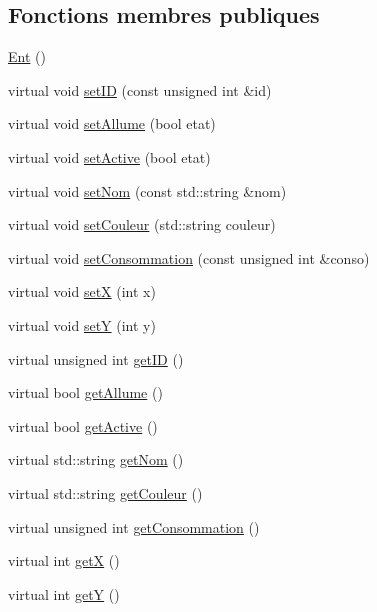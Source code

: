 \subsection*{Fonctions membres publiques}
\begin{DoxyCompactItemize}
\item 
\hyperlink{classEclairage_1_1Ent_a2c185a5889bd49a541d9e1785b25322a}{Ent} ()
\item 
virtual void \hyperlink{classEclairage_1_1Ent_a927ff132e908bb3e68dab254f6c2ac2d}{set\+ID} (const unsigned int \&id)
\item 
virtual void \hyperlink{classEclairage_1_1Ent_a3c9d21bd3c725857050e39eb449d1ad5}{set\+Allume} (bool etat)
\item 
virtual void \hyperlink{classEclairage_1_1Ent_a1e9471a412f746a2284778c8d9548499}{set\+Active} (bool etat)
\item 
virtual void \hyperlink{classEclairage_1_1Ent_a348836d7b3c2f69f376d63c84ace8e3e}{set\+Nom} (const std\+::string \&nom)
\item 
virtual void \hyperlink{classEclairage_1_1Ent_a4cf307c89bd19221aa2cd338fa2eef7d}{set\+Couleur} (std\+::string couleur)
\item 
virtual void \hyperlink{classEclairage_1_1Ent_a64c03bcbe84186341b0d9f23e91cdfd8}{set\+Consommation} (const unsigned int \&conso)
\item 
virtual void \hyperlink{classEclairage_1_1Ent_a4c5528c086dee2b6c5433c6e103f7eeb}{setX} (int x)
\item 
virtual void \hyperlink{classEclairage_1_1Ent_abdf5e31d5b5788c832b964c3712b7231}{setY} (int y)
\item 
virtual unsigned int \hyperlink{classEclairage_1_1Ent_a503507f6dc76a84b54e22ef21d9f301d}{get\+ID} ()
\item 
virtual bool \hyperlink{classEclairage_1_1Ent_a6d968244e96edee75019717f95dbb1d2}{get\+Allume} ()
\item 
virtual bool \hyperlink{classEclairage_1_1Ent_a7fdf3efdeb7ec2f649a79a1681db6e1e}{get\+Active} ()
\item 
virtual std\+::string \hyperlink{classEclairage_1_1Ent_ae440f0f45ec8f6d11e54c1a0ebe8d5c1}{get\+Nom} ()
\item 
virtual std\+::string \hyperlink{classEclairage_1_1Ent_aab5bf5f43963b1d3918b06f1a8348c7e}{get\+Couleur} ()
\item 
virtual unsigned int \hyperlink{classEclairage_1_1Ent_afb847965b5bcccc415bb169e500656f9}{get\+Consommation} ()
\item 
virtual int \hyperlink{classEclairage_1_1Ent_a0b54632cd5ff1bcb588c4f8527361990}{getX} ()
\item 
virtual int \hyperlink{classEclairage_1_1Ent_a12a54fa5d966278eefc4b035142ade70}{getY} ()
\end{DoxyCompactItemize}


